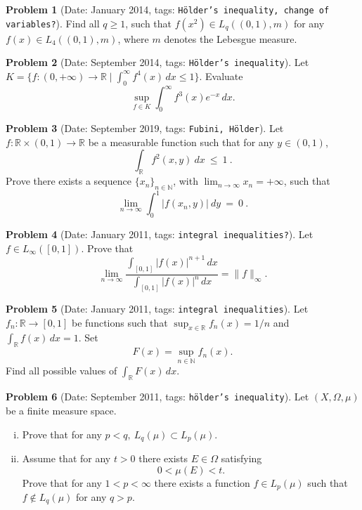 \documentclass[11pt, notitlepage]{article}
\theoremstyle{definition}
\theoremstyle{definition}
\theoremstyle{definition}
\newtheorem{probstate}{Problem}
\theoremstyle{remark}
\newenvironment{problem}[2]{
    \begin{probstate}[Date: #1, tags: {\color{white} \texttt{#2}}]
}
{
  \end{probstate}
}
\newcommand{\R}{\mathbb{R}}
\begin{document}
\begin{problem}{January 2014}{H\"older's inequality, change of variables?}
Find all $q \ge 1$, such that $f(x^2) \in L_q((0,1),m)$ for any $f(x)  \in L_4((0,1),m)$, where $m$ denotes the Lebesgue measure.
\end{problem}

\begin{problem}{September 2014}{H\"older's inequality}
Let $K=\{f :(0,+\infty) \to \R \mid \int_0^{\infty} f^4(x) \, dx \le 1  \}$. Evaluate
\[
  \sup_{f \in K} \int_0^\infty f^3(x) e^{-x}  \, dx.
\]
\end{problem}

\begin{problem}{September 2019}{Fubini, Hölder}
    Let $f:\mathbb{R}\times (0,1)\to\mathbb{R}$ be a measurable function such that for any $y\in(0,1)$,
$$\int_{\mathbb{R}} f^2(x,y) \ dx \ \le \ 1\  .
$$
Prove there exists a sequence $\{x_n\}_{n\in\mathbb{N}}$, with $\lim_{n\to\infty}x_n=+\infty$, such that
$$\lim_{n\to\infty} \int_0^1 |f(x_n,y)| \ dy \ = \ 0 \  .
$$
\end{problem}

\begin{problem}{January 2011}{integral inequalities?}
  Let $f \in L_{\infty}([0,1])$. Prove that
 \[
   \lim_{n \to \infty} \frac{\int_{[0,1]} |f(x)|^{n+1} \, dx}{\int_{[0,1]} |f(x)|^{n} \, dx} = \|f\|_{\infty}.
 \]
\end{problem}

\begin{problem}{January 2011}{integral inequalities}
  Let $f_n: \mathbb{R} \to [0, 1]$ be functions such that
 $\sup_{x \in \mathbb{R}} f_n(x)=1/n$ and $\int_{\mathbb{R}} f(x) \, dx=1$. Set
 \[
  F(x)= \sup_{n \in \mathbb{N}} f_n(x).
 \]
 Find all possible values of $\int_{\mathbb{R}} F(x) \, dx$.

\end{problem}

\begin{problem}{September 2011}{hölder's inequality}
  Let $(X,\Omega, \mu)$ be a finite measure space.
 \begin{enumerate}[(i)]
   \item Prove that for any $p<q, \ L_q(\mu) \subset L_p(\mu)$.
   \item Assume that for any
 $t>0$ there exists $E \in \Omega$ satisfying
 \[
  0< \mu(E) <t.
 \]
 Prove that for any $1<p< \infty$ there exists a function $f \in
 L_p(\mu)$ such that $f \notin L_q(\mu)$ for any $q>p$.
\end{enumerate}
\end{problem}
\end{document}
